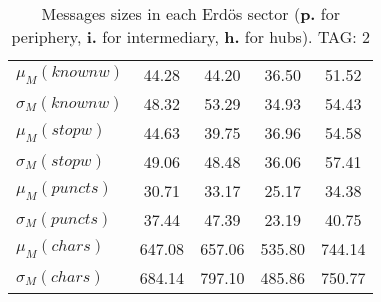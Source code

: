 \begin{table}[h!]
\begin{center}
\begin{tabular}{| l || c | c | c | c |}
$\mu_M(knownw)$ & 44.28  & 44.20  & 36.50  & 51.52 \\
$\sigma_M(knownw)$ & 48.32  & 53.29  & 34.93  & 54.43 \\\hline
$\mu_M(stopw)$ & 44.63  & 39.75  & 36.96  & 54.58 \\
$\sigma_M(stopw)$ & 49.06  & 48.48  & 36.06  & 57.41 \\\hline
$\mu_M(puncts)$ & 30.71  & 33.17  & 25.17  & 34.38 \\
$\sigma_M(puncts)$ & 37.44  & 47.39  & 23.19  & 40.75 \\\hline
$\mu_M(chars)$ & 647.08  & 657.06  & 535.80  & 744.14 \\
$\sigma_M(chars)$ & 684.14  & 797.10  & 485.86  & 750.77 \\\hline
\end{tabular}
\caption{Messages sizes in each Erd\"os sector ({{\bf p.}} for periphery, {{\bf i.}} for intermediary, {{\bf h.}} for hubs). TAG: 2}
\end{center}
\end{table}